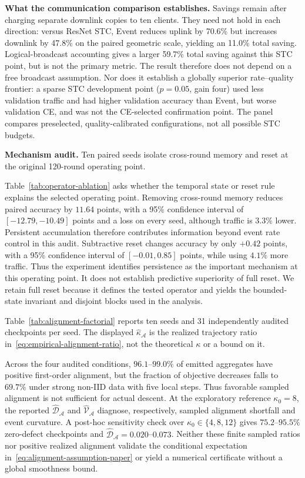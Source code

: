 \documentclass[conference]{IEEEtran}
\newcommand{\reviewrev}[1]{#1}
\newcommand{\coreColor}{\color{coreblue}}
\newcommand{\coreRev}[1]{{\coreColor #1}}
\begin{document}
\coreRev{\textbf{What the communication comparison establishes.}
Savings remain after charging separate downlink copies to ten clients.
They need not hold in each direction: versus ResNet STC, Event reduces
uplink by 70.6\% but increases downlink by 47.8\% on the paired geometric scale,
yielding an 11.0\% total saving. Logical-broadcast accounting gives a larger
59.7\% total saving against this STC point, but is not the primary metric.
The result therefore does not depend on a free broadcast assumption.
Nor does it establish a globally superior rate--quality frontier:
a sparse STC development point ($p=0.05$, gain four) used less validation
traffic and had higher validation accuracy than Event, but worse validation
CE, and was not the CE-selected confirmation point. The panel compares
preselected, quality-calibrated configurations, not all possible STC budgets.}

\textbf{Mechanism audit.}
\reviewrev{Ten paired seeds isolate cross-round memory and reset
at the original 120-round operating point.}



\reviewrev{Table~\ref{tab:operator-ablation} asks whether the temporal state or
reset rule explains the selected operating point.} Removing cross-round memory
reduces paired accuracy by $11.64$ points, with a 95\% confidence interval of
$[-12.79,-10.49]$ points and a loss on every seed, although traffic is $3.3\%$
lower. Persistent accumulation therefore contributes information beyond event
rate control in this audit. Subtractive reset changes accuracy by only $+0.42$
points, with a 95\% confidence interval of $[-0.01,0.85]$ points, while using
$4.1\%$ more traffic. Thus the experiment identifies persistence as the
important mechanism at this operating point. It does not establish predictive
superiority of full reset. We retain full reset because it defines the tested
operator and yields the bounded-state invariant and disjoint blocks used in
the analysis.

\reviewrev{Table~\ref{tab:alignment-factorial} reports ten seeds
and 31 independently audited checkpoints per seed.
The displayed $\widehat\kappa_{\mathcal A}$ is the realized
trajectory ratio in~\eqref{eq:empirical-alignment-ratio},
not the theoretical $\kappa$ or a bound on it.}

\reviewrev{Across the four audited conditions,
$96.1$--$99.0\%$ of emitted aggregates have positive first-order
alignment, but the fraction of objective decreases falls to
$69.7\%$ under strong non-IID data with five local steps.
Thus favorable sampled alignment is not sufficient for actual
descent. At the exploratory reference $\kappa_0=8$, the
reported $\widehat{\mathcal D}_{\mathcal A}$ and
$\widehat{\mathcal V}_{\mathcal A}$ diagnose, respectively,
sampled alignment shortfall and event curvature.
A post-hoc sensitivity check over $\kappa_0\in\{4,8,12\}$
gives $75.2$--$95.5\%$ zero-defect checkpoints and
$\widehat{\mathcal D}_{\mathcal A}=0.020$--$0.073$.
Neither these finite sampled ratios nor positive realized
alignment validate the conditional expectation
in~\eqref{eq:alignment-assumption-paper} or yield a numerical
certificate without a global smoothness bound.}
\end{document}
